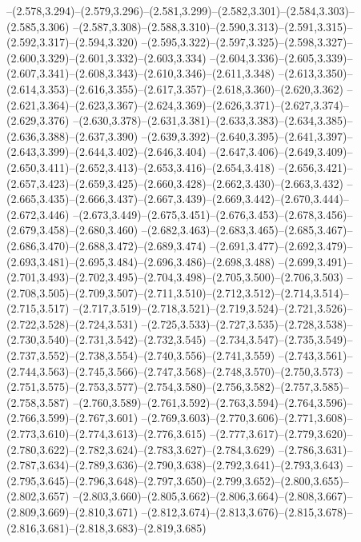   --(2.578,3.294)--(2.579,3.296)--(2.581,3.299)--(2.582,3.301)--(2.584,3.303)--(2.585,3.306)%
  --(2.587,3.308)--(2.588,3.310)--(2.590,3.313)--(2.591,3.315)--(2.592,3.317)--(2.594,3.320)%
  --(2.595,3.322)--(2.597,3.325)--(2.598,3.327)--(2.600,3.329)--(2.601,3.332)--(2.603,3.334)%
  --(2.604,3.336)--(2.605,3.339)--(2.607,3.341)--(2.608,3.343)--(2.610,3.346)--(2.611,3.348)%
  --(2.613,3.350)--(2.614,3.353)--(2.616,3.355)--(2.617,3.357)--(2.618,3.360)--(2.620,3.362)%
  --(2.621,3.364)--(2.623,3.367)--(2.624,3.369)--(2.626,3.371)--(2.627,3.374)--(2.629,3.376)%
  --(2.630,3.378)--(2.631,3.381)--(2.633,3.383)--(2.634,3.385)--(2.636,3.388)--(2.637,3.390)%
  --(2.639,3.392)--(2.640,3.395)--(2.641,3.397)--(2.643,3.399)--(2.644,3.402)--(2.646,3.404)%
  --(2.647,3.406)--(2.649,3.409)--(2.650,3.411)--(2.652,3.413)--(2.653,3.416)--(2.654,3.418)%
  --(2.656,3.421)--(2.657,3.423)--(2.659,3.425)--(2.660,3.428)--(2.662,3.430)--(2.663,3.432)%
  --(2.665,3.435)--(2.666,3.437)--(2.667,3.439)--(2.669,3.442)--(2.670,3.444)--(2.672,3.446)%
  --(2.673,3.449)--(2.675,3.451)--(2.676,3.453)--(2.678,3.456)--(2.679,3.458)--(2.680,3.460)%
  --(2.682,3.463)--(2.683,3.465)--(2.685,3.467)--(2.686,3.470)--(2.688,3.472)--(2.689,3.474)%
  --(2.691,3.477)--(2.692,3.479)--(2.693,3.481)--(2.695,3.484)--(2.696,3.486)--(2.698,3.488)%
  --(2.699,3.491)--(2.701,3.493)--(2.702,3.495)--(2.704,3.498)--(2.705,3.500)--(2.706,3.503)%
  --(2.708,3.505)--(2.709,3.507)--(2.711,3.510)--(2.712,3.512)--(2.714,3.514)--(2.715,3.517)%
  --(2.717,3.519)--(2.718,3.521)--(2.719,3.524)--(2.721,3.526)--(2.722,3.528)--(2.724,3.531)%
  --(2.725,3.533)--(2.727,3.535)--(2.728,3.538)--(2.730,3.540)--(2.731,3.542)--(2.732,3.545)%
  --(2.734,3.547)--(2.735,3.549)--(2.737,3.552)--(2.738,3.554)--(2.740,3.556)--(2.741,3.559)%
  --(2.743,3.561)--(2.744,3.563)--(2.745,3.566)--(2.747,3.568)--(2.748,3.570)--(2.750,3.573)%
  --(2.751,3.575)--(2.753,3.577)--(2.754,3.580)--(2.756,3.582)--(2.757,3.585)--(2.758,3.587)%
  --(2.760,3.589)--(2.761,3.592)--(2.763,3.594)--(2.764,3.596)--(2.766,3.599)--(2.767,3.601)%
  --(2.769,3.603)--(2.770,3.606)--(2.771,3.608)--(2.773,3.610)--(2.774,3.613)--(2.776,3.615)%
  --(2.777,3.617)--(2.779,3.620)--(2.780,3.622)--(2.782,3.624)--(2.783,3.627)--(2.784,3.629)%
  --(2.786,3.631)--(2.787,3.634)--(2.789,3.636)--(2.790,3.638)--(2.792,3.641)--(2.793,3.643)%
  --(2.795,3.645)--(2.796,3.648)--(2.797,3.650)--(2.799,3.652)--(2.800,3.655)--(2.802,3.657)%
  --(2.803,3.660)--(2.805,3.662)--(2.806,3.664)--(2.808,3.667)--(2.809,3.669)--(2.810,3.671)%
  --(2.812,3.674)--(2.813,3.676)--(2.815,3.678)--(2.816,3.681)--(2.818,3.683)--(2.819,3.685)%
